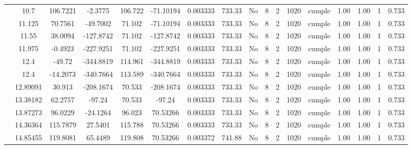 \begin{table}[H]
{\begin{tabular}{|c|c|c|c|c|c|c|c|c|c|c|c|c|c|c|c|c|}
\cline{2-17}        & 10.7 & 106.7221 & -2.3775 & 106.722 & -71.10194 & 0.003333 & 733.33 & No  & 8   & 2   & 1020 & \cellcolor[rgb]{ .776,  .937,  .808}cumple & 1.00 & 1.00 & 1   & 0.733 \bigstrut\\
\cline{2-17}        & 11.125 & 70.7561 & -49.7002 & 71.102 & -71.10194 & 0.003333 & 733.33 & No  & 8   & 2   & 1020 & \cellcolor[rgb]{ .776,  .937,  .808}cumple & 1.00 & 1.00 & 1   & 0.733 \bigstrut\\
\cline{2-17}        & 11.55 & 38.0094 & -127.8742 & 71.102 & -127.8742 & 0.003333 & 733.33 & No  & 8   & 2   & 1020 & \cellcolor[rgb]{ .776,  .937,  .808}cumple & 1.00 & 1.00 & 1   & 0.733 \bigstrut\\
\cline{2-17}        & 11.975 & -0.4923 & -227.9251 & 71.102 & -227.9251 & 0.003333 & 733.33 & No  & 8   & 2   & 1020 & \cellcolor[rgb]{ .776,  .937,  .808}cumple & 1.00 & 1.00 & 1   & 0.733 \bigstrut\\
\cline{2-17}        & \cellcolor[rgb]{ .851,  .882,  .949}12.4 & -49.72 & -344.8819 & 114.961 & -344.8819 & 0.003333 & 733.33 & No  & 8   & 2   & 1020 & \cellcolor[rgb]{ .776,  .937,  .808}cumple & 1.00 & 1.00 & 1   & 0.733 \bigstrut\\
\cline{2-17}        & \cellcolor[rgb]{ .851,  .882,  .949}12.4 & -14.2073 & -340.7664 & 113.589 & -340.7664 & 0.003333 & 733.33 & No  & 8   & 2   & 1020 & \cellcolor[rgb]{ .776,  .937,  .808}cumple & 1.00 & 1.00 & 1   & 0.733 \bigstrut\\
\cline{2-17}        & 12.89091 & 30.913 & -208.1674 & 70.533 & -208.1674 & 0.003333 & 733.33 & No  & 8   & 2   & 1020 & \cellcolor[rgb]{ .776,  .937,  .808}cumple & 1.00 & 1.00 & 1   & 0.733 \bigstrut\\
\cline{2-17}        & 13.38182 & 62.2757 & -97.24 & 70.533 & -97.24 & 0.003333 & 733.33 & No  & 8   & 2   & 1020 & \cellcolor[rgb]{ .776,  .937,  .808}cumple & 1.00 & 1.00 & 1   & 0.733 \bigstrut\\
\cline{2-17}        & 13.87273 & 96.0229 & -24.1264 & 96.023 & 70.53266 & 0.003333 & 733.33 & No  & 8   & 2   & 1020 & \cellcolor[rgb]{ .776,  .937,  .808}cumple & 1.00 & 1.00 & 1   & 0.733 \bigstrut\\
\cline{2-17}        & 14.36364 & 115.7879 & 27.5401 & 115.788 & 70.53266 & 0.003333 & 733.33 & No  & 8   & 2   & 1020 & \cellcolor[rgb]{ .776,  .937,  .808}cumple & 1.00 & 1.00 & 1   & 0.733 \bigstrut\\
\cline{2-17}        & 14.85455 & 119.8081 & 65.4489 & 119.808 & 70.53266 & 0.003372 & 741.88 & No  & 8   & 2   & 1020 & \cellcolor[rgb]{ .776,  .937,  .808}cumple & 1.00 & 1.00 & 1   & 0.733 \bigstrut\\

\end{tabular}}
\end{table}
